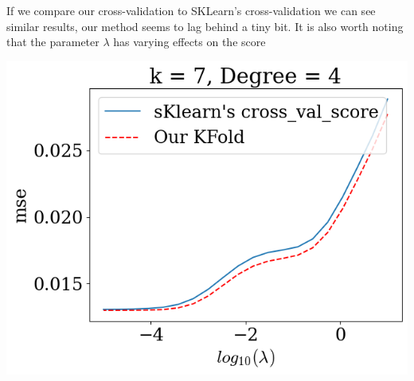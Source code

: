 \documentclass[twoside,11pt]{report}
\begin{document}
\begin{minipage}[!t]{.48\linewidth}
    If we compare our cross-validation to SKLearn's cross-validation we can see similar results,
    our method seems to lag behind a tiny bit. It is also worth noting that the parameter $\lambda$ has
    varying effects on the score
\end{minipage}
\hspace{4mm}
\begin{minipage}[!t]{.48\linewidth}
    \begin{center}
        \includegraphics[width=1.0\textwidth]{../runsAndAdditions/crossvalOursVsSklearn.png}
    \end{center}
\end{minipage}\\
\end{document}
